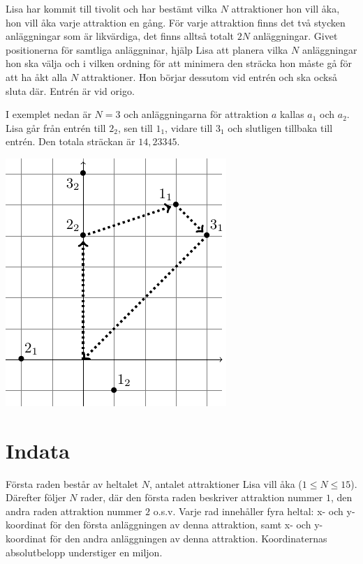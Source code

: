 Lisa har kommit till tivolit och har bestämt vilka $N$ attraktioner hon vill åka, hon vill åka varje attraktion en gång.
För varje attraktion finns det två stycken anläggningar som är likvärdiga, det finns alltså totalt $2N$ anläggningar.
Givet positionerna för samtliga anläggninar, hjälp Lisa att planera vilka $N$ anläggningar hon ska välja och i vilken ordning för att minimera den sträcka hon måste gå för att ha åkt alla $N$ attraktioner.
Hon börjar dessutom vid entrén och ska också sluta där.
Entrén är vid origo.


I exemplet nedan är $N=3$ och anläggningarna för attraktion $a$ kallas $a_1$ och $a_2$.
Lisa går från entrén till $2_2$, sen till $1_1$, vidare till $3_1$ och slutligen tillbaka till entrén.
Den totala sträckan är $14{,}23345$.

\bigskip
\includegraphics{img/tivoli-sample-img.pdf}

\section*{Indata}
Första raden består av heltalet $N$, antalet attraktioner Lisa vill åka ($1 \le N \le 15$).
Därefter följer $N$ rader, där den första raden beskriver attraktion nummer $1$, den andra raden attraktion nummer $2$ o.s.v.
Varje rad innehåller fyra heltal: x- och y-koordinat för den första anläggningen av denna attraktion, samt x- och y-koordinat för den andra anläggningen av denna attraktion.
Koordinaternas absolutbelopp understiger en miljon.

